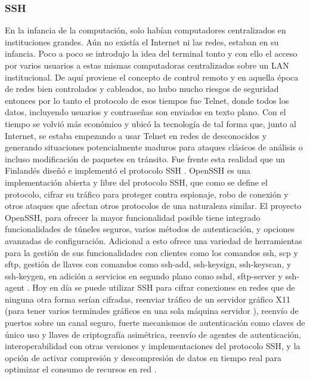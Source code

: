 \subsubsection{SSH}
En la infancia de la computación, solo habían computadores centralizados en instituciones grandes. Aún no existía el Internet ni las  redes, estaban en su infancia. Poco a poco se introdujo la idea del terminal tonto y con ello el acceso por varios usuarios a estas mismas computadoras centralizados sobre un LAN institucional. De aquí proviene el concepto de control remoto y en aquella época de redes bien controlados y cableados, no hubo mucho riesgos de seguridad entonces por lo tanto el protocolo de esos tiempos fue Telnet, donde todos los datos, incluyendo usuarios y contraseñas son enviados en texto plano. Con el tiempo se volvió más económico y ubicó la tecnología de tal forma que, junto al Internet, se estaba empezando a usar Telnet en redes de desconocidos y generando situaciones potencialmente maduros para ataques clásicos de análisis o incluso modificación de paquetes en tránsito. Fue frente esta realidad que un Finlandés diseñó e implementó el protocolo SSH \citep{GeerlingJeff-History-Remote-Access}. OpenSSH es una implementación abierta y libre \citep{OpenBSD-OpenSSH-Features} del protocolo SSH, que como se define el protocolo, cifrar su tráfico para proteger contra espionaje, robo de conexión y otros ataques que afectan otros protocolos de una naturaleza similar. El proyecto OpenSSH, para ofrecer la mayor funcionalidad posible tiene integrado funcionalidades de túneles seguros, varios métodos de autenticación, y opciones avanzadas de configuración. Adicional a esto ofrece una variedad de herramientas para la gestión de sus funcionalidades con clientes como los comandos ssh, scp y sftp, gestión de llaves con comandos como ssh-add, ssh-keysign, ssh-keyscan, y ssh-keygen, en adición a servicios en segundo plano como sshd, sftp-server y ssh-agent \citep{OpenSSH}. Hoy en día se puede utilizar SSH para cifrar conexiones en redes que de ninguna otra forma serían cifradas, reenviar tráfico de un servidor gráfico X11 (para tener varios terminales gráficos en una sola máquina servidor \citep{ENP-Tunneling}), reenvío de puertos sobre un canal seguro, fuerte mecanismos de autenticación como claves de único uso y llaves de criptografía asimétrica, reenvío de agentes de autenticación, interoperabilidad con otras versiones y implementaciones del protocolo SSH, y la opción de activar compresión y descompresión de datos en tiempo real para optimizar el consumo de recursos en red \citep{OpenBSD-OpenSSH-Features} \citep{OpenBSD-manpages-SSH}.

